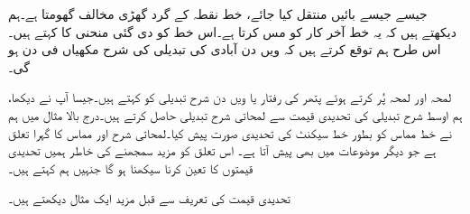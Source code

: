جیسے جیسے   بائیں منتقل کیا جائے، خط  نقطہ  کے گرد گھڑی مخالف   گھومتا ہے۔ہم دیکھتے ہیں کہ یہ خط آخر کار  کو مس کرتا ہے۔اس خط کو دی گئی  منحنی کا  کہتے ہیں۔اس طرح ہم توقع کرتے ہیں کہ  ویں دن آبادی کی تبدیلی کی شرح  مکھیاں فی دن ہو گی۔

لمحہ  اور لمحہ  پُر کرتے ہوئے پتھر کی رفتار یا  ویں دن شرح تبدیلی کو  کہتے ہیں۔جیسا آپ نے دیکھا، ہم اوسط شرح تبدیلی کی تحدیدی قیمت سے لمحاتی شرح تبدیلی حاصل کرتے ہیں۔درج بالا مثال میں ہم نے خط مماس کو بطور خط سیکنٹ کی تحدیدی  صورت پیش کیا۔لمحاتی شرح اور مماس کا گہرا تعلق ہے جو دیگر موضوعات میں بھی پیش آتا ہے۔ اس تعلق کو مزید سمجھنے کی خاطر ہمیں  تحدیدی قیمتوں  کا تعین کرنا سیکھنا ہو گا جنہیں ہم  کہتے ہیں۔ 

تحدیدی قیمت کی تعریف سے قبل  مزید ایک  مثال دیکھتے ہیں۔


